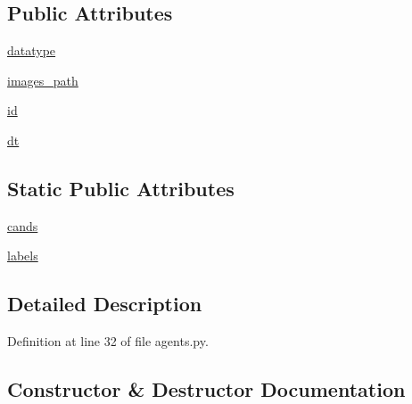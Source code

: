 \subsection*{Public Attributes}
\begin{DoxyCompactItemize}
\item 
\hyperlink{classparlai_1_1tasks_1_1nlvr_1_1agents_1_1DefaultTeacher_a0d82ff42ca2bdc37d2cc0dde80dc67ef}{datatype}
\item 
\hyperlink{classparlai_1_1tasks_1_1nlvr_1_1agents_1_1DefaultTeacher_a2f3e63f887c9884ac7d12aee734c9a19}{images\+\_\+path}
\item 
\hyperlink{classparlai_1_1tasks_1_1nlvr_1_1agents_1_1DefaultTeacher_a7809defc508b35dd2fcaae25173db4a6}{id}
\item 
\hyperlink{classparlai_1_1tasks_1_1nlvr_1_1agents_1_1DefaultTeacher_a6473aea8efc0cffb97b718bb024207ac}{dt}
\end{DoxyCompactItemize}
\subsection*{Static Public Attributes}
\begin{DoxyCompactItemize}
\item 
\hyperlink{classparlai_1_1tasks_1_1nlvr_1_1agents_1_1DefaultTeacher_aaa54982525636760c12db73e15ced0b1}{cands}
\item 
\hyperlink{classparlai_1_1tasks_1_1nlvr_1_1agents_1_1DefaultTeacher_ad57e5163af3a0a418302c7a8c13ae17a}{labels}
\end{DoxyCompactItemize}


\subsection{Detailed Description}


Definition at line 32 of file agents.\+py.



\subsection{Constructor \& Destructor Documentation}
\mbox{\label{classparlai_1_1tasks_1_1nlvr_1_1agents_1_1DefaultTeacher_a5d4a9625d4bd1de73a9815bb791da051}} 
